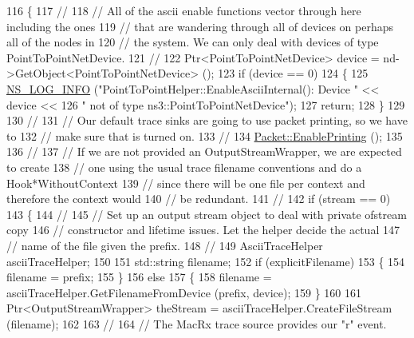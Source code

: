 \begin{DoxyCode}
116 \{
117   \textcolor{comment}{//}
118   \textcolor{comment}{// All of the ascii enable functions vector through here including the ones}
119   \textcolor{comment}{// that are wandering through all of devices on perhaps all of the nodes in}
120   \textcolor{comment}{// the system.  We can only deal with devices of type PointToPointNetDevice.}
121   \textcolor{comment}{//}
122   Ptr<PointToPointNetDevice> device = nd->GetObject<PointToPointNetDevice> ();
123   \textcolor{keywordflow}{if} (device == 0)
124     \{
125       \hyperlink{group__logging_gafbd73ee2cf9f26b319f49086d8e860fb}{NS\_LOG\_INFO} (\textcolor{stringliteral}{"PointToPointHelper::EnableAsciiInternal(): Device "} << device << 
126                    \textcolor{stringliteral}{" not of type ns3::PointToPointNetDevice"});
127       \textcolor{keywordflow}{return};
128     \}
129 
130   \textcolor{comment}{//}
131   \textcolor{comment}{// Our default trace sinks are going to use packet printing, so we have to }
132   \textcolor{comment}{// make sure that is turned on.}
133   \textcolor{comment}{//}
134   \hyperlink{classns3_1_1Packet_ae17c0cd8e63e83df3c9273801e3d5d7f}{Packet::EnablePrinting} ();
135 
136   \textcolor{comment}{//}
137   \textcolor{comment}{// If we are not provided an OutputStreamWrapper, we are expected to create }
138   \textcolor{comment}{// one using the usual trace filename conventions and do a Hook*WithoutContext}
139   \textcolor{comment}{// since there will be one file per context and therefore the context would}
140   \textcolor{comment}{// be redundant.}
141   \textcolor{comment}{//}
142   \textcolor{keywordflow}{if} (stream == 0)
143     \{
144       \textcolor{comment}{//}
145       \textcolor{comment}{// Set up an output stream object to deal with private ofstream copy }
146       \textcolor{comment}{// constructor and lifetime issues.  Let the helper decide the actual}
147       \textcolor{comment}{// name of the file given the prefix.}
148       \textcolor{comment}{//}
149       AsciiTraceHelper asciiTraceHelper;
150 
151       std::string filename;
152       \textcolor{keywordflow}{if} (explicitFilename)
153         \{
154           filename = prefix;
155         \}
156       \textcolor{keywordflow}{else}
157         \{
158           filename = asciiTraceHelper.GetFilenameFromDevice (prefix, device);
159         \}
160 
161       Ptr<OutputStreamWrapper> theStream = asciiTraceHelper.CreateFileStream (filename);
162 
163       \textcolor{comment}{//}
164       \textcolor{comment}{// The MacRx trace source provides our "r" event.}

\end{DoxyCode}
